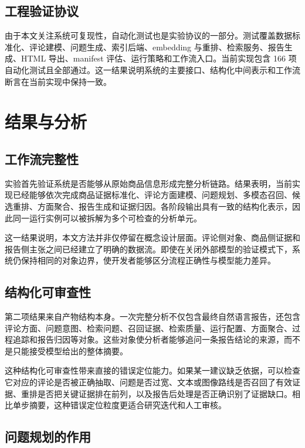 \documentclass[11pt]{article}
\begin{document}
\subsection{工程验证协议}

由于本文关注系统可复现性，自动化测试也是实验协议的一部分。测试覆盖数据标准化、评论建模、问题生成、索引后端、embedding 与重排、检索服务、报告生成、HTML 导出、manifest 评估、运行策略和工作流入口。当前实现包含 166 项自动化测试且全部通过。这一结果说明系统的主要接口、结构化中间表示和工作流断言在当前实现中保持一致。

\section{结果与分析}
\subsection{工作流完整性}

实验首先验证系统是否能够从原始商品信息形成完整分析链路。结果表明，当前实现已经能够依次完成商品证据标准化、评论方面建模、问题规划、多模态召回、候选重排、方面聚合、报告生成和证据归因。各阶段输出具有一致的结构化表示，因此同一运行实例可以被拆解为多个可检查的分析单元。

这一结果说明，本文方法并非仅停留在概念设计层面。评论侧对象、商品侧证据和报告侧主张之间已经建立了明确的数据流。即使在关闭外部模型的验证模式下，系统仍保持相同的对象边界，使开发者能够区分流程正确性与模型能力差异。

\subsection{结构化可审查性}

第二项结果来自产物结构本身。一次完整分析不仅包含最终自然语言报告，还包含评论方面、问题意图、检索问题、召回证据、检索质量、运行配置、方面聚合、过程追踪和报告归因等对象。这些对象使分析者能够追问一条报告结论的来源，而不是只能接受模型给出的整体摘要。

这种结构化可审查性带来直接的错误定位能力。如果某一建议缺乏依据，可以检查它对应的评论是否被正确抽取、问题是否过宽、文本或图像路线是否召回了有效证据、重排是否把关键证据排在前列，以及报告后处理是否正确识别了证据缺口。相比单步摘要，这种错误定位粒度更适合研究迭代和人工审核。

\subsection{问题规划的作用}
\end{document}
